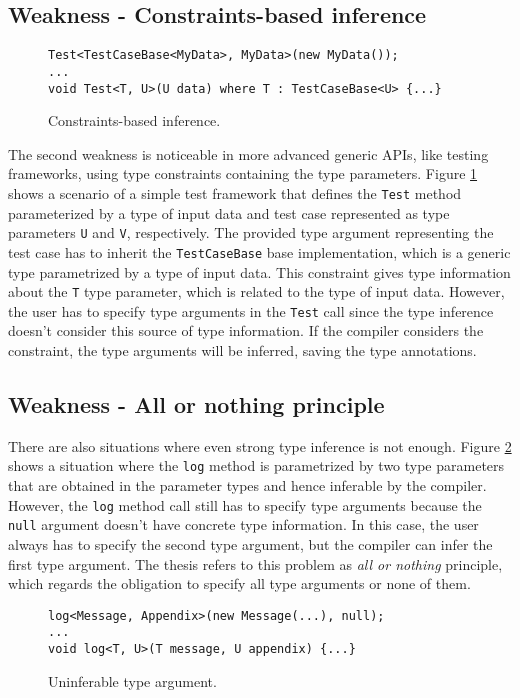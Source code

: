 \subsection{Weakness - Constraints-based inference}

\begin{figure}[h]
\begin{lstlisting}[style=csharp]
Test<TestCaseBase<MyData>, MyData>(new MyData());
...
void Test<T, U>(U data) where T : TestCaseBase<U> {...}
\end{lstlisting}
\caption{Constraints-based inference.}
\label{img28:usecase2}
\end{figure}
The second weakness is noticeable in more advanced generic APIs, like testing frameworks, using type constraints containing the type parameters. 
Figure \ref{img28:usecase2} shows a scenario of a simple test framework that defines the \texttt{Test} method parameterized by a type of input data and test case represented as type parameters \texttt{U} and \texttt{V}, respectively. 
The provided type argument representing the test case has to inherit the \texttt{TestCaseBase} base implementation, which is a generic type parametrized by a type of input data. 
This constraint gives type information about the \texttt{T} type parameter, which is related to the type of input data. 
However, the user has to specify type arguments in the \texttt{Test} call since the type inference doesn’t consider this source of type information. 
If the compiler considers the constraint, the type arguments will be inferred, saving the type annotations.

\subsection{Weakness - All or nothing principle}

There are also situations where even strong type inference is not enough.
Figure \ref{img29:usecase3} shows a situation where the \texttt{log} method is parametrized by two type parameters that are obtained in the parameter types and hence inferable by the compiler. 
However, the \texttt{log} method call still has to specify type arguments because the \texttt{null} argument doesn’t have concrete type information. 
In this case, the user always has to specify the second type argument, but the compiler can infer the first type argument. 
The thesis refers to this problem as \textit{all or nothing} principle, which regards the obligation to specify all type arguments or none of them.
\begin{figure}[h]
\begin{lstlisting}[style=csharp]
log<Message, Appendix>(new Message(...), null);
...
void log<T, U>(T message, U appendix) {...}
\end{lstlisting}
\caption{Uninferable type argument.}
\label{img29:usecase3}
\end{figure}

